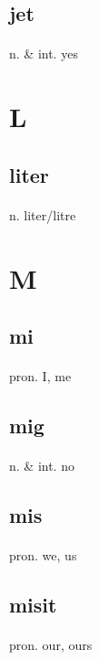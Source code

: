 \documentclass[UTF8]{article}
\begin{document}
    \subsection{jet}
    \paragraph{} n. \& int. yes 
    \newpage \section{L}
    \subsection{liter}
    \paragraph{} n. liter/litre 
    \newpage \section{M}
    \subsection{mi}
    \paragraph{} pron. I, me 
    \subsection{mig}
    \paragraph{} n. \& int. no 
    \subsection{mis}
    \paragraph{} pron. we, us 
    \subsection{misit}
    \paragraph{} pron. our, ours 
\end{document}
